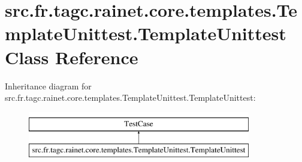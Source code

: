 \hypertarget{classsrc_1_1fr_1_1tagc_1_1rainet_1_1core_1_1templates_1_1TemplateUnittest_1_1TemplateUnittest}{\section{src.\-fr.\-tagc.\-rainet.\-core.\-templates.\-Template\-Unittest.\-Template\-Unittest Class Reference}
\label{classsrc_1_1fr_1_1tagc_1_1rainet_1_1core_1_1templates_1_1TemplateUnittest_1_1TemplateUnittest}
}
Inheritance diagram for src.\-fr.\-tagc.\-rainet.\-core.\-templates.\-Template\-Unittest.\-Template\-Unittest\-:\begin{figure}[H]
\begin{center}
\leavevmode
\includegraphics[height=2.000000cm]{classsrc_1_1fr_1_1tagc_1_1rainet_1_1core_1_1templates_1_1TemplateUnittest_1_1TemplateUnittest}
\end{center}
\end{figure}

